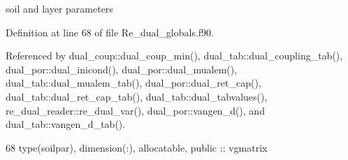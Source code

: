 soil and layer parameters 



Definition at line 68 of file Re\+\_\+dual\+\_\+globals.\+f90.



Referenced by dual\+\_\+coup\+::dual\+\_\+coup\+\_\+min(), dual\+\_\+tab\+::dual\+\_\+coupling\+\_\+tab(), dual\+\_\+por\+::dual\+\_\+inicond(), dual\+\_\+por\+::dual\+\_\+mualem(), dual\+\_\+tab\+::dual\+\_\+mualem\+\_\+tab(), dual\+\_\+por\+::dual\+\_\+ret\+\_\+cap(), dual\+\_\+tab\+::dual\+\_\+ret\+\_\+cap\+\_\+tab(), dual\+\_\+tab\+::dual\+\_\+tabvalues(), re\+\_\+dual\+\_\+reader\+::re\+\_\+dual\+\_\+var(), dual\+\_\+por\+::vangen\+\_\+d(), and dual\+\_\+tab\+::vangen\+\_\+d\+\_\+tab().


\begin{DoxyCode}
68   \textcolor{keywordtype}{type}(soilpar), \textcolor{keywordtype}{dimension(:)}, \textcolor{keywordtype}{allocatable}, \textcolor{keywordtype}{public} :: vgmatrix
\end{DoxyCode}
